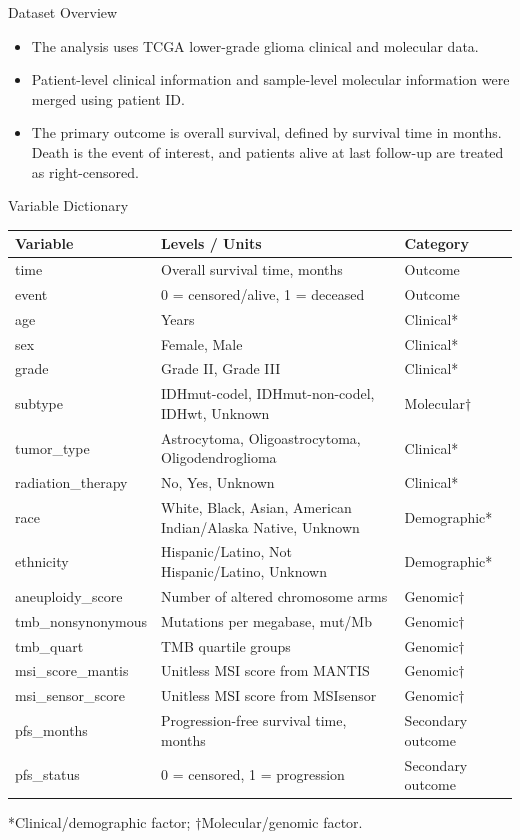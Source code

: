 \documentclass{beamer}
\begin{document}
\begin{frame}{Dataset Overview}
\begin{itemize}
  \item The analysis uses TCGA lower-grade glioma clinical and molecular data.
  \item Patient-level clinical information and sample-level molecular information were merged using patient ID.
  \item The primary outcome is overall survival, defined by survival time in months. Death is the event of interest, and patients alive at last follow-up are treated as right-censored.
\end{itemize}
\end{frame}

\begin{frame}{Variable Dictionary}
\tiny
\centering
\begin{tabular}{lll}
\toprule
\textbf{Variable} & \textbf{Levels / Units} & \textbf{Category} \\
\midrule
time & Overall survival time, months & Outcome \\
event & 0 = censored/alive, 1 = deceased & Outcome \\
age & Years & Clinical* \\
sex & Female, Male & Clinical* \\
grade & Grade II, Grade III & Clinical* \\
subtype & IDHmut-codel, IDHmut-non-codel, IDHwt, Unknown & Molecular$\dagger$ \\
tumor\_type & Astrocytoma, Oligoastrocytoma, Oligodendroglioma & Clinical* \\
radiation\_therapy & No, Yes, Unknown & Clinical* \\
race & White, Black, Asian, American Indian/Alaska Native, Unknown & Demographic* \\
ethnicity & Hispanic/Latino, Not Hispanic/Latino, Unknown & Demographic* \\
aneuploidy\_score & Number of altered chromosome arms & Genomic$\dagger$ \\
tmb\_nonsynonymous & Mutations per megabase, mut/Mb & Genomic$\dagger$ \\
tmb\_quart & TMB quartile groups & Genomic$\dagger$ \\
msi\_score\_mantis & Unitless MSI score from MANTIS & Genomic$\dagger$ \\
msi\_sensor\_score & Unitless MSI score from MSIsensor & Genomic$\dagger$ \\
pfs\_months & Progression-free survival time, months & Secondary outcome \\
pfs\_status & 0 = censored, 1 = progression & Secondary outcome \\
\bottomrule
\end{tabular}

\vspace{0.15cm}
\footnotesize
*Clinical/demographic factor; $\dagger$Molecular/genomic factor.
\end{frame}
\end{document}
